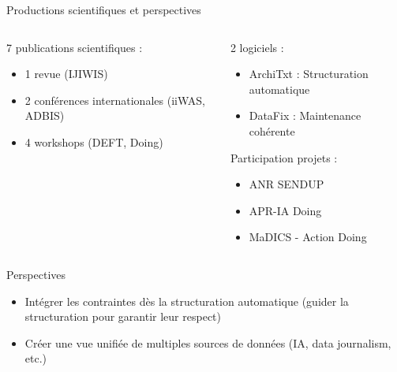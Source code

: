 \documentclass[english,french,table,aspectratio=43]{beamer}
\renewcommand{\_}{\ifincsname_\else\legacyunderscore\fi}
\begin{document}
\begin{frame}{Productions scientifiques et perspectives}
    \begin{columns}
        \begin{column}{.5\linewidth}
            7 publications scientifiques :
            \begin{itemize}
                \item 1 revue (IJIWIS)
                \item 2 conférences internationales (iiWAS, ADBIS)
                \item 4 workshops (DEFT, Doing)
            \end{itemize}
        \end{column}
        \begin{column}{.5\linewidth}
            2 logiciels :
            \begin{itemize}
                \item ArchiTxt : Structuration automatique
                \item DataFix : Maintenance cohérente
            \end{itemize}
            Participation projets :
            \begin{itemize}
                \item ANR SENDUP
                \item APR-IA Doing
                \item MaDICS - Action Doing
            \end{itemize}
        \end{column}
    \end{columns}
    \vfill
    \begin{block}{Perspectives}
        \begin{itemize} 
            \item Intégrer les contraintes dès la structuration automatique (guider la structuration pour garantir leur respect)
            \item Créer une vue unifiée de multiples sources de données (IA, data journalism, etc.)
        \end{itemize}
    \end{block}
\end{frame}

\frame{\titlepage}

%     
%     
\end{document}
